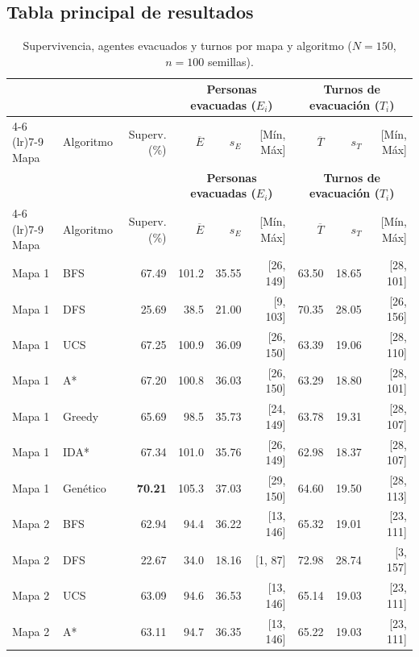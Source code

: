 \documentclass[11pt,letterpaper]{article}
\begin{document}
\subsection{Tabla principal de resultados}
\small
\setlength{\tabcolsep}{3.5pt}
\begin{longtable}{@{}llrrrrrrr@{}}
\caption{Supervivencia, agentes evacuados y turnos por mapa y algoritmo ($N=150$, $n=100$ semillas).}\label{tab:resultados}\\
\toprule
& & & \multicolumn{3}{c}{\textbf{Personas evacuadas ($E_i$)}} & \multicolumn{3}{c}{\textbf{Turnos de evacuación ($T_i$)}} \\
\cmidrule(lr){4-6} \cmidrule(lr){7-9}
Mapa & Algoritmo & Superv. (\%) & $\overline{E}$ & $s_E$ & [Mín, Máx] & $\overline{T}$ & $s_T$ & [Mín, Máx] \\
\midrule
\endfirsthead
\toprule
& & & \multicolumn{3}{c}{\textbf{Personas evacuadas ($E_i$)}} & \multicolumn{3}{c}{\textbf{Turnos de evacuación ($T_i$)}} \\
\cmidrule(lr){4-6} \cmidrule(lr){7-9}
Mapa & Algoritmo & Superv. (\%) & $\overline{E}$ & $s_E$ & [Mín, Máx] & $\overline{T}$ & $s_T$ & [Mín, Máx] \\
\midrule
\endhead
\bottomrule
\endfoot
Mapa 1 & BFS      & 67.49 & 101.2 & 35.55 & [26, 149] & 63.50 & 18.65 & [28, 101] \\
Mapa 1 & DFS      & 25.69 &  38.5 & 21.00 &  [9, 103] & 70.35 & 28.05 & [26, 156] \\
Mapa 1 & UCS      & 67.25 & 100.9 & 36.09 & [26, 150] & 63.39 & 19.06 & [28, 110] \\
Mapa 1 & A*       & 67.20 & 100.8 & 36.03 & [26, 150] & 63.29 & 18.80 & [28, 101] \\
Mapa 1 & Greedy   & 65.69 &  98.5 & 35.73 & [24, 149] & 63.78 & 19.31 & [28, 107] \\
Mapa 1 & IDA*     & 67.34 & 101.0 & 35.76 & [26, 149] & 62.98 & 18.37 & [28, 107] \\
Mapa 1 & Genético & \textbf{70.21} & 105.3 & 37.03 & [29, 150] & 64.60 & 19.50 & [28, 113] \\
\midrule
Mapa 2 & BFS      & 62.94 &  94.4 & 36.22 & [13, 146] & 65.32 & 19.01 & [23, 111] \\
Mapa 2 & DFS      & 22.67 &  34.0 & 18.16 &  [1,  87] & 72.98 & 28.74 &  [3, 157] \\
Mapa 2 & UCS      & 63.09 &  94.6 & 36.53 & [13, 146] & 65.14 & 19.03 & [23, 111] \\
Mapa 2 & A*       & 63.11 &  94.7 & 36.35 & [13, 146] & 65.22 & 19.03 & [23, 111] \\

\end{longtable}
\end{document}
